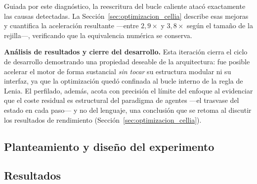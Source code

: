 Guiada por este diagnóstico, la reescritura del bucle caliente atacó exactamente
las causas detectadas. La Sección~\ref{sec:optimizacion_cellia} describe esas
mejoras y cuantifica la aceleración resultante —entre $2{,}9\times$ y
$3{,}8\times$ según el tamaño de la rejilla—, verificando que la equivalencia
numérica se conserva.

\textbf{Análisis de resultados y cierre del desarrollo.}
Esta iteración cierra el ciclo de desarrollo demostrando una propiedad deseable
de la arquitectura: fue posible acelerar el motor de forma sustancial \emph{sin
tocar} su estructura modular ni su interfaz, ya que la optimización quedó
confinada al bucle interno de la regla de Lenia. El perfilado, además, acota con
precisión el límite del enfoque al evidenciar que el coste residual es
estructural del paradigma de agentes —el trasvase del estado en cada paso— y no
del lenguaje, una conclusión que se retoma al discutir los resultados de
rendimiento (Sección~\ref{sec:optimizacion_cellia}).


%
\subsection{Planteamiento y diseño del experimento}
\label{sec:rendimiento_planteamiento}

\subsection{Resultados}
\label{sec:rendimiento_resultados}

